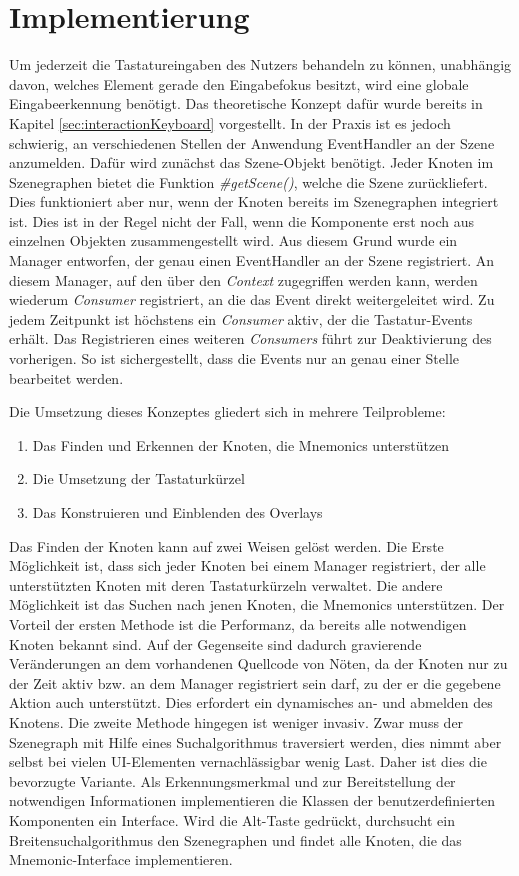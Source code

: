 \section{Implementierung} \label{sec:interactionImplementation}
Um jederzeit die Tastatureingaben des Nutzers behandeln zu können, unabhängig davon, welches Element gerade den Eingabefokus besitzt, wird eine globale Eingabeerkennung benötigt. Das theoretische Konzept dafür wurde bereits in Kapitel \ref{sec:interactionKeyboard} vorgestellt. In der Praxis ist es jedoch schwierig, an verschiedenen Stellen der Anwendung EventHandler an der Szene anzumelden. Dafür wird zunächst das Szene-Objekt benötigt. Jeder Knoten im Szenegraphen bietet die Funktion \textit{\#{}getScene()}, welche die Szene zurückliefert. Dies funktioniert aber nur, wenn der Knoten bereits im Szenegraphen integriert ist. Dies ist in der Regel nicht der Fall, wenn die Komponente erst noch aus einzelnen Objekten zusammengestellt wird. Aus diesem Grund wurde ein Manager entworfen, der genau einen EventHandler an der Szene registriert. An diesem Manager, auf den über den \textit{Context} zugegriffen werden kann, werden wiederum \textit{Consumer} registriert, an die das Event direkt weitergeleitet wird. Zu jedem Zeitpunkt ist höchstens ein \textit{Consumer} aktiv, der die Tastatur-Events erhält. Das Registrieren eines weiteren \textit{Consumers} führt zur Deaktivierung des vorherigen. So ist sichergestellt, dass die Events nur an genau einer Stelle bearbeitet werden.\par
{}
Die Umsetzung dieses Konzeptes gliedert sich in mehrere Teilprobleme:
\begin{enumerate}
 \item Das Finden und Erkennen der Knoten, die Mnemonics unterstützen
 \item Die Umsetzung der Tastaturkürzel
 \item Das Konstruieren und Einblenden des Overlays
\end{enumerate}
Das Finden der Knoten kann auf zwei Weisen gelöst werden. Die Erste Möglichkeit ist, dass sich jeder Knoten bei einem Manager registriert, der alle unterstützten Knoten mit deren Tastaturkürzeln verwaltet. Die andere Möglichkeit ist das Suchen nach jenen Knoten, die Mnemonics unterstützen. Der Vorteil der ersten Methode ist die Performanz, da bereits alle notwendigen Knoten bekannt sind. Auf der Gegenseite sind dadurch gravierende Veränderungen an dem vorhandenen Quellcode von Nöten, da der Knoten nur zu der Zeit aktiv bzw. an dem Manager registriert sein darf, zu der er die gegebene Aktion auch unterstützt. Dies erfordert ein dynamisches an- und abmelden des Knotens. Die zweite Methode hingegen ist weniger invasiv. Zwar muss der Szenegraph mit Hilfe eines Suchalgorithmus traversiert werden, dies nimmt aber selbst bei vielen UI-Elementen vernachlässigbar wenig Last. Daher ist dies die bevorzugte Variante. Als Erkennungsmerkmal und zur Bereitstellung der notwendigen Informationen implementieren die Klassen der benutzerdefinierten Komponenten ein Interface. Wird die Alt-Taste gedrückt, durchsucht ein Breitensuchalgorithmus den Szenegraphen und findet alle Knoten, die das Mnemonic-Interface implementieren.\par
